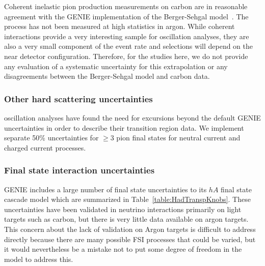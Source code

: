 Coherent inelastic pion production measurements on carbon are in reasonable agreement with the GENIE implementation of the Berger-Sehgal model~\cite{Mislivec:2017qfz}.  The process has not been measured at high statistics in argon. While coherent interactions provide a very interesting sample for oscillation analyses, they are also a very small component of the event rate and selections will depend on the near detector configuration. Therefore, for the studies here, we do not provide any evaluation of a systematic uncertainty for this extrapolation or any disagreements between the Berger-Sehgal model and carbon data.  

\subsubsection{Other hard scattering uncertainties}

\nova oscillation analyses\cite{nova_2018} have found the need for excursions beyond the default GENIE uncertainties in order to describe their transition region data.  We implement separate 50\% uncertainties for $\geq 3$ pion final states for neutral current and charged current processes.

\subsubsection{Final state interaction uncertainties}\label{sec:fsi}
GENIE includes a large number of final state uncertainties to its $hA$ final state cascade model which are summarized in Table~\ref{table:HadTranspKnobs}.  These uncertainties have been validated in neutrino interactions primarily on light targets such as carbon, but there is very little data available on argon targets.  
This concern about the lack of validation on Argon targets is difficult to address directly because there are many possible FSI processes that could be varied, but it would nevertheless be a mistake not to put some degree of freedom in the model to address this.

